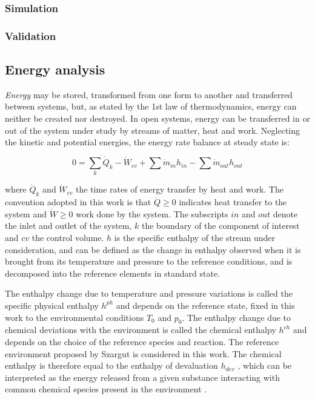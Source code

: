 \documentclass[final,times,3p]{elsarticle}
\begin{document}
		\subsubsection{Simulation}
	
		\subsubsection{Validation}
			
	\subsection{Energy analysis}
	\label{subsec:energy_analysis}
		
	\emph{Energy} may be stored, transformed from one form to another and transferred between systems, but, as stated by the 1st law of thermodynamics, energy can neither be created nor destroyed. In open systems, energy can be transferred in or out of the system under study by streams of matter, heat and work. Neglecting the kinetic and potential energies, the energy rate balance at steady state is:
	
	\begin{equation}
	0=\sum_k \dot{Q}_{k}-\dot{W}_{cv} + \sum \dot{m}_{in} h_{in} - \sum \dot{m}_{out} h_{out}
	\end{equation}
	
	where $\dot{Q}_{k}$ and $\dot{W}_{cv}$ the time rates of energy transfer by heat and work. The convention adopted in this work is that $\dot{Q}\ge0$ indicates heat transfer to the system and $\dot{W}\ge0$ work done by the system. The subscripts $in$ and $out$ denote the inlet and outlet of the system, $k$ the boundary of the component of interest and $cv$ the control volume. $h$ is the specific enthalpy of the stream under consideration, and can be defined as the change in enthalpy observed when it is brought from its temperature and pressure to the reference conditions, and is decomposed into the reference elements in standard state. 
	
	
	The enthalpy change due to temperature and pressure variations is called the specific physical enthalpy $h^{ph}$ and depends on the reference state, fixed in this work to the environmental conditions $T_0$ and $p_0$. The enthalpy change due to chemical deviations with the environment is called the chemical enthalpy $h^{ch}$ and depends on the choice of the reference species and reaction. The reference environment proposed by Szargut is considered in this work. The chemical enthalpy is therefore equal to the enthalpy of devaluation $h_{dev}$ \cite{Kotas1995}, which can be interpreted as the energy released from a given substance interacting with common chemical species present in the environment \cite{Szargut1988}. 
	
\end{document}
